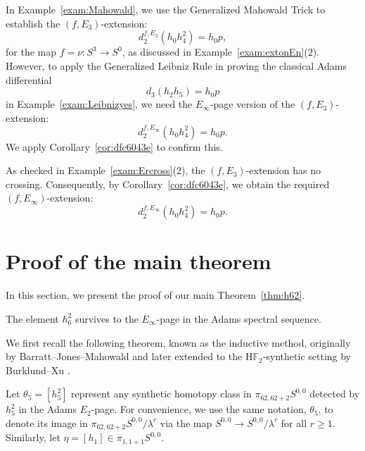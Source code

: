\documentclass{amsart}
\numberwithin{equation}{section}
\begin{document}
\begin{example} \label{exam:stretchext}
    In Example~\ref{exam:Mahowald}, we use the Generalized Mahowald Trick to establish the $(f, E_3)$-extension:
        $$d_2^{f, E_3} (h_0h_4^2) = h_0 p,$$
        for the map $f=\nu:S^3 \rightarrow S^0$, as discussed
in Example~\ref{exam:extonEn}(2). However, to apply the Generalized Leibniz Rule in proving the classical Adams differential 
$$d_3(h_2h_5) = h_0p$$
in Example~\ref{exam:Leibnizyes}, we need the $E_\infty$-page version of the $(f, E_3)$-extension:
$$d_2^{f, E_\infty} (h_0h_4^2) = h_0 p.$$
We apply Corollary~\ref{cor:dfc6043e} to confirm this.

As checked in Example~\ref{exam:Ercross}(2), the $(f, E_3)$-extension has no crossing. Consequently, by Corollary~\ref{cor:dfc6043e}, we obtain the required $(f, E_\infty)$-extension:
$$d_2^{f, E_\infty} (h_0h_4^2) = h_0 p.$$
\end{example}


\section{Proof of the main theorem}

In this section, we present the proof of our main Theorem~\ref{thm:h62}. 

\begin{theorem} \label{thm:126survives}
    The element $h_6^2$ survives to the $E_\infty$-page in the Adams spectral sequence.
\end{theorem}

We first recall the following theorem, known as the inductive method, originally by Barratt--Jones--Mahowald \cite{BJMinduction} and later extended to the H$\mathbb{F}_2$-synthetic setting by Burklund--Xu \cite[Proposition~7.19]{BurklundXu}.

\begin{notation}
    Let $\theta_5 = [h_5^2]$ represent any synthetic homotopy class in $\pi_{62,62+2}S^{0,0}$ detected by $h_5^2$ in the Adams $E_2$-page. For convenience, we use the same notation, $\theta_5$, to denote its image in $\pi_{62,62+2}S^{0,0}/\lambda^r$ via the map $S^{0,0} \rightarrow S^{0,0}/\lambda^r$ for all $r \ge 1$. Similarly, let $\eta = [h_1] \in \pi_{1,1+1}S^{0,0}$.
\end{notation}
\end{document}
